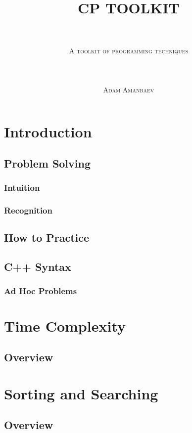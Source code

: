 \documentclass[titlepage]{article}
\title{
    \huge \textbf{CP TOOLKIT}
    \vskip -0.5cm
}
\author{
    \rule{6cm}{0.2mm} \\[0.3cm]
    \small \scshape{A toolkit of programming techniques} \\[0.2cm]
    \rule{6cm}{0.2mm} \\[0.3cm]
    \small \scshape{Adam Amanbaev}
}
\begin{document}
\maketitle

\newpage

\tableofcontents

\newpage

\section{Introduction}

\subsection{Problem Solving}
\subsubsection{Intuition}
\subsubsection{Recognition}

\subsection{How to Practice}

\subsection{C++ Syntax}
\subsubsection{Ad Hoc Problems}

\newpage

\section{Time Complexity}
\subsection{Overview}

\newpage

\section{Sorting and Searching}
\subsection{Overview}
\end{document}
